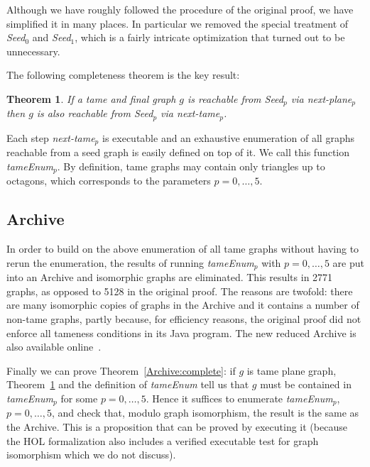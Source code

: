 \documentclass[11pt]{amsart}
\newtheorem{thm}{Theorem}
\begin{document}
Although we have roughly followed the procedure of the original proof, we have simplified it in
many places. In particular we removed the special treatment of
\textit{Seed$_0$} and \textit{Seed$_1$}, which is a fairly intricate
optimization that turned out to be unnecessary.

The following completeness theorem is the key result:
\begin{thm}\label{thm:TameEnum_comp}
If a tame and final graph $g$ is reachable from
\textit{Seed$_p$} via \textit{next-plane$_p$}
then $g$ is also reachable from \textit{Seed$_p$} via \textit{next-tame$_p$}.
\end{thm}

Each step \textit{next-tame$_p$} is executable and an exhaustive enumeration
of all graphs reachable from a seed graph is easily defined on top of it. We
call this function \textit{tameEnum$_p$}. By definition, tame graphs may
contain only triangles up to octagons, which corresponds to the parameters $p
= 0,\dots,5$.

\subsection{Archive}

In order to build on the above enumeration of all tame graphs without having
to rerun the enumeration, the results of running \textit{tameEnum$_p$} with
$p = 0,\dots,5$ are put into an Archive and isomorphic graphs are
eliminated. This results in 2771 graphs, as opposed to 5128 in the original proof. The
reasons are twofold: there are many isomorphic copies of graphs in the
Archive and it contains a number of non-tame graphs, partly because, for
efficiency reasons, the original proof did not enforce all tameness conditions in its Java
program. The new reduced Archive is also available
online~\cite{BauerN-AFP06}.

Finally we can prove Theorem~\ref{Archive:complete}: if $g$ is tame plane
graph, Theorem~\ref{thm:TameEnum_comp} and the definition of
\textit{tameEnum} tell us that $g$ must be contained in \textit{tameEnum$_p$}
for some $p=0,\dots,5$. Hence it suffices to enumerate \textit{tameEnum$_p$},
$p=0,\dots,5$, and check that, modulo graph isomorphism, the result is the
same as the Archive. This is a proposition that can be proved by executing it
(because the HOL formalization also includes a verified executable test for
graph isomorphism which we do not discuss).
\end{document}
